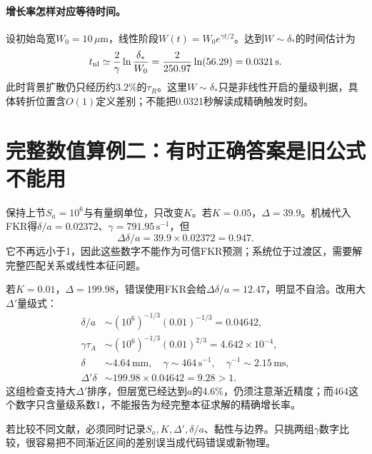 \paragraph{增长率怎样对应等待时间。}
设初始岛宽$W_0=10\,\mu\mathrm m$，线性阶段$W(t)=W_0e^{\gamma t/2}$。达到$W\sim\delta_*$的时间估计为
\begin{equation}
 t_{\rm nl}\simeq\frac2\gamma\ln\frac{\delta_*}{W_0}
 =\frac2{250.97}\ln(56.29)=0.0321\,\mathrm s.
\end{equation}
此时背景扩散仍只经历约$3.2\%$的$\tau_R$。这里$W\sim\delta_*$只是非线性开启的量级判据，具体转折位置含$O(1)$定义差别；不能把0.0321秒解读成精确触发时刻。

\section{完整数值算例二：有时正确答案是旧公式不能用}
保持上节$S_a=10^6$与有量纲单位，只改变$K$。若$K=0.05$，$\Delta=39.9$。机械代入FKR得$\delta/a=0.02372$、$\gamma=791.95\,\mathrm{s^{-1}}$，但
\begin{equation}
 \Delta\delta/a=39.9\times0.02372=0.947.
\end{equation}
它不再远小于1，因此这些数字不能作为可信FKR预测；系统位于过渡区，需要解完整匹配关系或线性本征问题。

若$K=0.01$，$\Delta=199.98$，错误使用FKR会给$\Delta\delta/a=12.47$，明显不自洽。改用大$\Delta'$量级式：
\begin{align}
 \delta/a&\sim(10^6)^{-1/3}(0.01)^{-1/3}=0.04642,\\
 \gamma\tau_A&\sim(10^6)^{-1/3}(0.01)^{2/3}=4.642\times10^{-4},\\
 \delta&\sim4.64\,\mathrm{mm},\quad\gamma\sim464\,\mathrm{s^{-1}},\quad
 \gamma^{-1}\sim2.15\,\mathrm{ms},\\
 \Delta'\delta&\sim199.98\times0.04642=9.28>1.
\end{align}
这组检查支持大$\Delta'$排序，但层宽已经达到$a$的4.6\%，仍须注意渐近精度；而464这个数字只含量级系数1，不能报告为经完整本征求解的精确增长率。

若比较不同文献，必须同时记录$S_a,K,\Delta',\delta/a$、黏性与边界。只挑两组$\gamma$数字比较，很容易把不同渐近区间的差别误当成代码错误或新物理。

